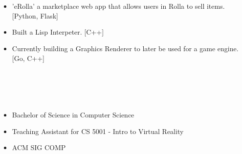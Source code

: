\documentclass{article}
\begin{document}
\section{\\}
\color{black}
\begin{itemize}
  \item 'eRolla' a marketplace web app that allows users in Rolla to sell items. [Python, Flask]
  \item Built a Lisp Interpeter. [C++]
  \item Currently building a Graphics Renderer to later be used for a game engine. [Go, C++]
  \end{itemize}
\section{\\}
\color{black}
\begin{itemize}
\subsection{\large Missouri University of Science and Technology\hfill\mdseries Graduated May 2021}
\item Bachelor of Science in Computer Science
\item Teaching Assistant for CS 5001 - Intro to Virtual Reality
\item ACM SIG COMP
\end{itemize}
\end{document}
